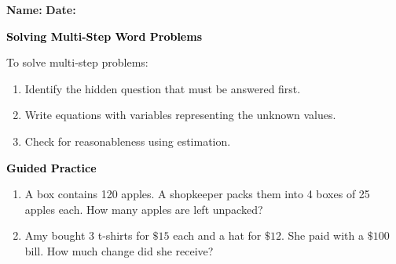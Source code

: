 \documentclass[12pt, letterpaper, fleqn]{article}
\begin{document}
\textbf{Name:} \underline{\hspace{5cm}}
\hfill
\textbf{Date:} \underline{\hspace{3cm}}\\

\begin{tcolorbox}[colback=customteal!20]
    \large\textcolor{black}{\textbf{Solving Multi-Step Word Problems}}
\end{tcolorbox}

\vspace{3mm}
To solve multi-step problems:
\begin{enumerate}
    \item Identify the hidden question that must be answered first.
    \item Write equations with variables representing the unknown values.
    \item Check for reasonableness using estimation.
\end{enumerate}

\newpage
\begin{tcolorbox}[colback=customteal!20]
    \large\textcolor{black}{\textbf{Guided Practice}}
\end{tcolorbox}

\vspace{5mm}
\begin{enumerate}[itemsep=3.5cm, leftmargin=0.6cm]
\item A box contains 120 apples. A shopkeeper packs them into 4 boxes of 25 apples each. How many apples are left unpacked?
\vspace{3cm}

\item Amy bought 3 t-shirts for $\$15$ each and a hat for $\$12$. She paid with a $\$100$ bill. How much change did she receive?
\end{enumerate}
\end{document}
